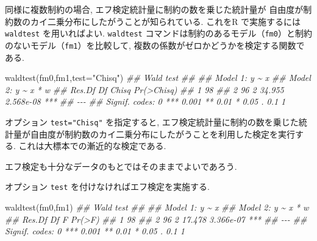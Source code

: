 \documentclass[
  letterpaper,
  xelatex,
  ja=standard, xelatex]{bxjsbook}
\newenvironment{Shaded}{\begin{snugshade}}{\end{snugshade}}
\newcommand{\AttributeTok}[1]{\textcolor[rgb]{0.40,0.45,0.13}{#1}}
\newcommand{\DocumentationTok}[1]{\textcolor[rgb]{0.37,0.37,0.37}{\textit{#1}}}
\newcommand{\FunctionTok}[1]{\textcolor[rgb]{0.28,0.35,0.67}{#1}}
\newcommand{\NormalTok}[1]{\textcolor[rgb]{0.00,0.23,0.31}{#1}}
\newcommand{\StringTok}[1]{\textcolor[rgb]{0.13,0.47,0.30}{#1}}
\begin{document}
同様に複数制約の場合, エフ検定統計量に制約の数を乗じた統計量が
自由度が制約数のカイ二乗分布にしたがうことが知られている. これをR
で実施するには \texttt{waldtest} を用いればよい. \texttt{waldtest}
コマンドは制約のあるモデル（\texttt{fm0}）と制約のないモデル（\texttt{fm1}）を比較して,
複数の係数がゼロかどうかを検定する関数である.

\begin{Shaded}
\begin{Highlighting}[]
\FunctionTok{waldtest}\NormalTok{(fm0,fm1,}\AttributeTok{test=}\StringTok{"Chisq"}\NormalTok{)}
\DocumentationTok{\#\# Wald test}
\DocumentationTok{\#\# }
\DocumentationTok{\#\# Model 1: y \textasciitilde{} x}
\DocumentationTok{\#\# Model 2: y \textasciitilde{} x * w}
\DocumentationTok{\#\#   Res.Df Df  Chisq Pr(\textgreater{}Chisq)    }
\DocumentationTok{\#\# 1     98                         }
\DocumentationTok{\#\# 2     96  2 34.955  2.568e{-}08 ***}
\DocumentationTok{\#\# {-}{-}{-}}
\DocumentationTok{\#\# Signif. codes:  0 \textquotesingle{}***\textquotesingle{} 0.001 \textquotesingle{}**\textquotesingle{} 0.01 \textquotesingle{}*\textquotesingle{} 0.05 \textquotesingle{}.\textquotesingle{} 0.1 \textquotesingle{} \textquotesingle{} 1}
\end{Highlighting}
\end{Shaded}

オプション \texttt{test="Chisq"} を指定すると,
エフ検定統計量に制約の数を乗じた統計量が自由度が制約数のカイ二乗分布にしたがうことを利用した検定を実行する.
これは大標本での漸近的な検定である.

エフ検定も十分なデータのもとではそのままでよいであろう.

オプション \texttt{test} を付けなければエフ検定を実施する.

\begin{Shaded}
\begin{Highlighting}[]
\FunctionTok{waldtest}\NormalTok{(fm0,fm1)}
\DocumentationTok{\#\# Wald test}
\DocumentationTok{\#\# }
\DocumentationTok{\#\# Model 1: y \textasciitilde{} x}
\DocumentationTok{\#\# Model 2: y \textasciitilde{} x * w}
\DocumentationTok{\#\#   Res.Df Df      F    Pr(\textgreater{}F)    }
\DocumentationTok{\#\# 1     98                        }
\DocumentationTok{\#\# 2     96  2 17.478 3.366e{-}07 ***}
\DocumentationTok{\#\# {-}{-}{-}}
\DocumentationTok{\#\# Signif. codes:  0 \textquotesingle{}***\textquotesingle{} 0.001 \textquotesingle{}**\textquotesingle{} 0.01 \textquotesingle{}*\textquotesingle{} 0.05 \textquotesingle{}.\textquotesingle{} 0.1 \textquotesingle{} \textquotesingle{} 1}
\end{Highlighting}
\end{Shaded}
\end{document}
